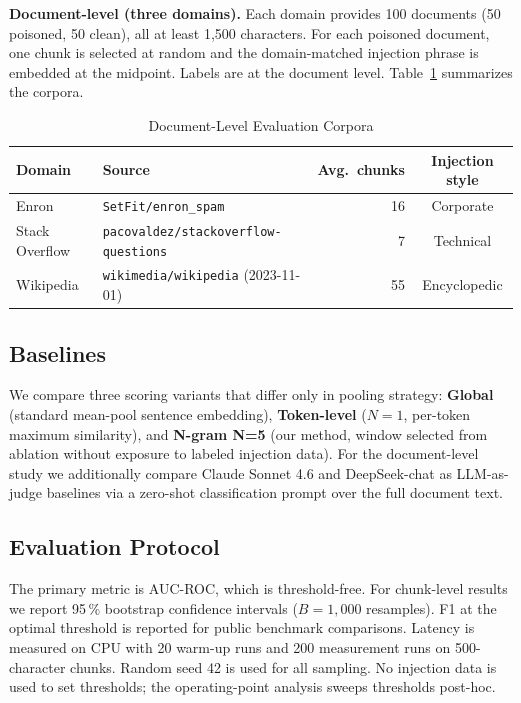 \documentclass[conference]{IEEEtran}
\begin{document}
\textbf{Document-level (three domains).} Each domain provides 100 documents
(50 poisoned, 50 clean), all at least 1,500 characters. For each poisoned document,
one chunk is selected at random and the domain-matched injection phrase is embedded
at the midpoint. Labels are at the document level. Table~\ref{tab:domains} summarizes
the corpora.

\begin{table}[t]
\caption{Document-Level Evaluation Corpora}
\label{tab:domains}
\centering
\begin{tabular}{llrc}
\toprule
Domain & Source & Avg.\ chunks & Injection style \\
\midrule
Enron & \texttt{SetFit/enron\_spam} & 16 & Corporate \\
Stack Overflow & \texttt{pacovaldez/stackoverflow-questions} & 7 & Technical \\
Wikipedia & \texttt{wikimedia/wikipedia} (2023-11-01) & 55 & Encyclopedic \\
\bottomrule
\end{tabular}
\end{table}

\subsection{Baselines}

We compare three scoring variants that differ only in pooling strategy:
\textbf{Global} (standard mean-pool sentence embedding),
\textbf{Token-level} (\(N=1\), per-token maximum similarity), and
\textbf{N-gram N=5} (our method, window selected from ablation without exposure to
labeled injection data). For the document-level study we additionally compare
Claude Sonnet 4.6 and DeepSeek-chat as LLM-as-judge baselines via a zero-shot
classification prompt over the full document text.

\subsection{Evaluation Protocol}

The primary metric is AUC-ROC, which is threshold-free. For chunk-level results we
report 95\,\% bootstrap confidence intervals (\(B = 1{,}000\) resamples). F1 at the
optimal threshold is reported for public benchmark comparisons. Latency is measured on
CPU with 20 warm-up runs and 200 measurement runs on 500-character chunks. Random seed
42 is used for all sampling. No injection data is used to set thresholds; the
operating-point analysis sweeps thresholds post-hoc.
\end{document}
